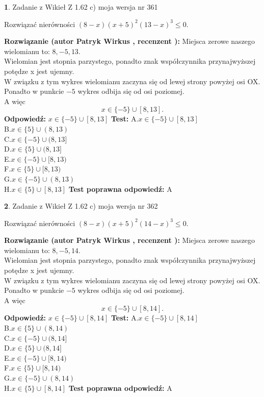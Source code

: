 \documentclass[12pt, a4paper]{article}
\theoremstyle{definition} %
\newtheorem{zad}{}
\newcommand{\zadStart}[1]{\begin{zad}#1\newline}
\newcommand{\zadStop}{\end{zad}}
\newcommand{\rozwStart}[2]{\noindent \textbf{Rozwiązanie (autor #1 , recenzent #2): }\newline}
\newcommand{\rozwStop}{\newline}
\newcommand{\odpStart}{\noindent \textbf{Odpowiedź:}\newline}
\newcommand{\odpStop}{\newline}
\newcommand{\testStart}{\noindent \textbf{Test:}\newline}
\newcommand{\testStop}{\newline}
\newcommand{\kluczStart}{\noindent \textbf{Test poprawna odpowiedź:}\newline}
\newcommand{\kluczStop}{\newline}
\begin{document}
\zadStart{Zadanie z Wikieł Z 1.62 c) moja wersja nr 361}

Rozwiązać nierówności $(8-x)(x+5)^{2}(13-x)^{3}\le0$.
\zadStop
\rozwStart{Patryk Wirkus}{}
Miejsca zerowe naszego wielomianu to: $8, -5, 13$.\\
Wielomian jest stopnia parzystego, ponadto znak współczynnika przy\linebreak najwyższej potędze x jest ujemny.\\ W związku z tym wykres wielomianu zaczyna się od lewej strony powyżej osi OX.\\
Ponadto w punkcie $-5$ wykres odbija się od osi poziomej.\\
A więc $$x \in \{-5\} \cup [8,13].$$
\rozwStop
\odpStart
$x \in \{-5\} \cup [8,13]$
\odpStop
\testStart
A.$x \in \{-5\} \cup [8,13]$\\
B.$x \in \{5\} \cup (8,13)$\\
C.$x \in \{-5\} \cup (8,13]$\\
D.$x \in \{5\} \cup (8,13]$\\
E.$x \in \{-5\} \cup [8,13)$\\
F.$x \in \{5\} \cup [8,13)$\\
G.$x \in \{-5\} \cup (8,13)$\\
H.$x \in \{5\} \cup [8,13]$
\testStop
\kluczStart
A
\kluczStop



\zadStart{Zadanie z Wikieł Z 1.62 c) moja wersja nr 362}

Rozwiązać nierówności $(8-x)(x+5)^{2}(14-x)^{3}\le0$.
\zadStop
\rozwStart{Patryk Wirkus}{}
Miejsca zerowe naszego wielomianu to: $8, -5, 14$.\\
Wielomian jest stopnia parzystego, ponadto znak współczynnika przy\linebreak najwyższej potędze x jest ujemny.\\ W związku z tym wykres wielomianu zaczyna się od lewej strony powyżej osi OX.\\
Ponadto w punkcie $-5$ wykres odbija się od osi poziomej.\\
A więc $$x \in \{-5\} \cup [8,14].$$
\rozwStop
\odpStart
$x \in \{-5\} \cup [8,14]$
\odpStop
\testStart
A.$x \in \{-5\} \cup [8,14]$\\
B.$x \in \{5\} \cup (8,14)$\\
C.$x \in \{-5\} \cup (8,14]$\\
D.$x \in \{5\} \cup (8,14]$\\
E.$x \in \{-5\} \cup [8,14)$\\
F.$x \in \{5\} \cup [8,14)$\\
G.$x \in \{-5\} \cup (8,14)$\\
H.$x \in \{5\} \cup [8,14]$
\testStop
\kluczStart
A
\kluczStop
\end{document}
